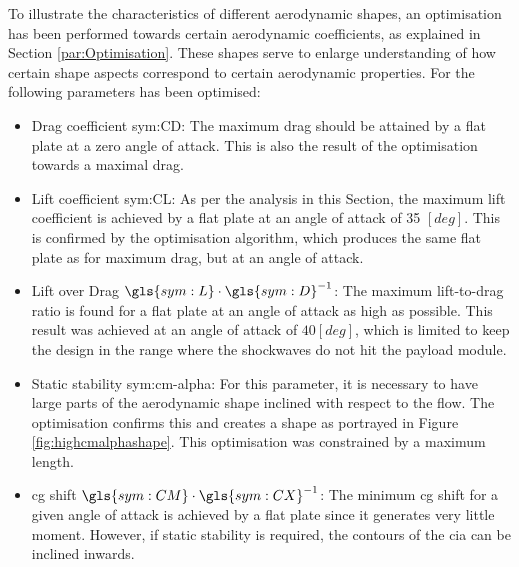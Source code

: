 To illustrate the characteristics of different aerodynamic shapes, an optimisation has been performed towards certain aerodynamic coefficients, as explained in Section \ref{par:Optimisation}. These shapes serve to enlarge understanding of how certain shape aspects correspond to certain aerodynamic properties. For the following parameters has been optimised:
\begin{itemize}
	\item Drag coefficient \gls{sym:CD}: The maximum drag should be attained by a flat plate at a zero angle of attack. This is also the result of the optimisation towards a maximal drag.
	\item Lift coefficient \gls{sym:CL}: As per the analysis in this Section, the maximum lift coefficient is achieved by a flat plate at an angle of attack of 35 $\left[deg\right]$. This is confirmed by the optimisation algorithm, which produces the same flat plate as for maximum drag, but at an angle of attack.
	\item Lift over Drag $\gls{sym:L}\cdot \gls{sym:D}^{-1}$: The maximum lift-to-drag ratio is found for a flat plate at an angle of attack as high as possible. This result was achieved at an angle of attack of $40 \left[deg\right]$, which is limited to keep the design in the range where the shockwaves do not hit the payload module.
	\item Static stability \gls{sym:cm-alpha}: For this parameter, it is necessary to have large parts of the aerodynamic shape inclined with respect to the flow. The optimisation confirms this and creates a shape as portrayed in Figure \ref{fig:highcmalphashape}. This optimisation was constrained by a maximum length.
	\item \gls{cg} shift $\gls{sym:CM}\cdot\gls{sym:CX}^{-1}$: The minimum \gls{cg} shift for a given angle of attack is achieved by a flat plate since it generates very little moment. However, if static stability is required, the contours of the \gls{cia} can be inclined inwards.
\end{itemize}

